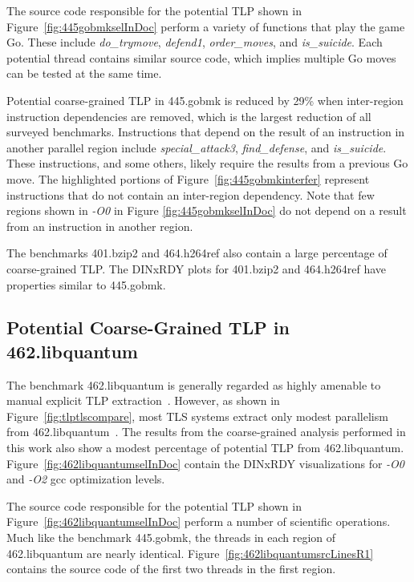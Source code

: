 {The source code responsible for the potential TLP shown in Figure~\ref{fig:445gobmkselInDoc} perform a variety of functions that play the game Go.  These include \textit{do\_trymove}, \textit{defend1}, \textit{order\_moves}, and \textit{is\_suicide}.  Each potential thread contains similar source code, which implies multiple Go moves can be tested at the same time.

Potential coarse-grained TLP in 445.gobmk is reduced by 29\% when inter-region instruction dependencies are removed, which is the largest reduction of all surveyed benchmarks.  Instructions that depend on the result of an instruction in another parallel region include \textit{special\_attack3}, \textit{find\_defense}, and \textit{is\_suicide}.  These instructions, and some others, likely require the results from a previous Go move.  The highlighted portions of Figure~\ref{fig:445gobmkinterfer} represent instructions that do not contain an inter-region dependency.  Note that few regions shown in \textit{-O0} in Figure \ref{fig:445gobmkselInDoc} do not depend on a result from an instruction in another region.

The benchmarks 401.bzip2 and 464.h264ref also contain a large percentage of coarse-grained TLP.  The DINxRDY plots for 401.bzip2 and 464.h264ref have properties similar to 445.gobmk.

\subsection{Potential Coarse-Grained TLP in 462.libquantum}

The benchmark 462.libquantum is generally regarded as highly amenable to manual explicit TLP extraction~\cite{glendinning:04:ppam}. However, as shown in Figure~\ref{fig:tlptlscompare}, most TLS systems extract only modest parallelism from 462.libquantum~\cite{kejariwal:2007:tap}.  The results from the coarse-grained analysis performed in this work also show a modest percentage of potential TLP from 462.libquantum. Figure~\ref{fig:462libquantumselInDoc} contain the DINxRDY visualizations for \textit{-O0} and \textit{-O2} gcc optimization levels.

The source code responsible for the potential TLP shown in Figure~\ref{fig:462libquantumselInDoc} perform a number of scientific operations.  Much like the benchmark 445.gobmk, the threads in each region of 462.libquantum are nearly identical. Figure~\ref{fig:462libquantumsrcLinesR1} contains the source code of the first two threads in the first region.

}

